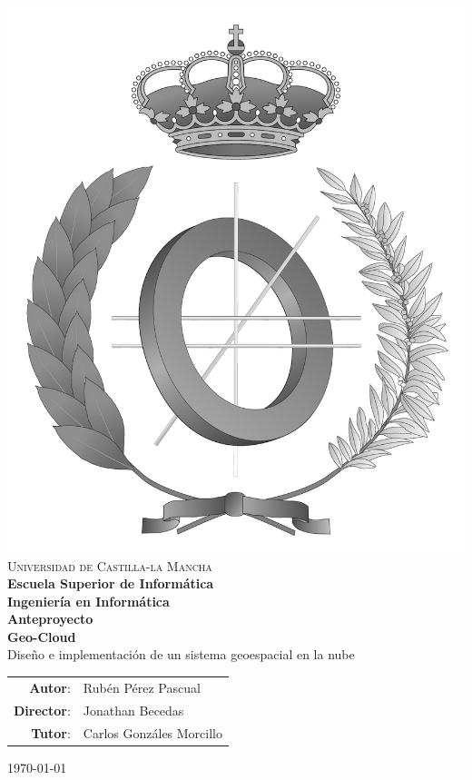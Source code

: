 \documentclass[a4paper,spanish,11pt,twoside]{article}
\begin{document}
\renewcommand*{\thepage}{\roman{page}}
\begin{titlepage}
\begin{center}
  \includegraphics[width=.3\textwidth]{logos/emblema_informatica-gray.pdf} \\
  \vspace*{0,5cm} {\Large \textsc{Universidad de Castilla-la Mancha\\}}
  \vspace{3mm}
  {\Large \textbf{Escuela Superior de Informática}}  \\
  \vspace{1,3cm}
  {\Large \textbf{Ingeniería en Informática}}\\
  \vspace{1cm}
  {\Large \textbf{Anteproyecto}} \\
  \vspace{1,3cm}
  \LARGE{\textbf{Geo-Cloud}\\Diseño e implementación de un sistema geoespacial en la nube}
  \vspace{0.1cm}

\end{center}
\vspace{2.0cm}
\begin{table}[!h]
  \Large
  \begin{tabular}{rl}
      \textbf{Autor}: & Rubén Pérez Pascual \\
      \textbf{Director}: & Jonathan Becedas \\
      \textbf{Tutor}: & Carlos Gonzáles Morcillo
  \end{tabular}
\end{table}
\begin{flushright}
{\large \today}
\end{flushright}
\end{titlepage}
\end{document}

